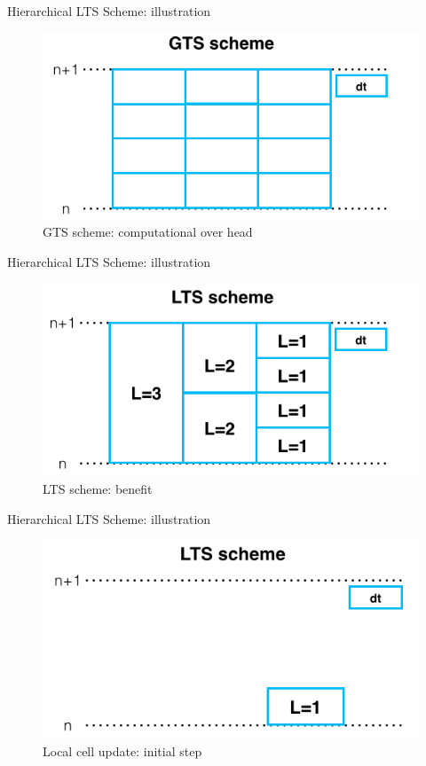 \documentclass{beamer}
\begin{document}
\begin{frame}{Hierarchical LTS Scheme: illustration}
\begin{figure}[p]
    \centering
    \includegraphics[width=1\textwidth]{GTS_scheme}
    \caption{GTS scheme: computational over head}
    \label{fig:awesome_image}
\end{figure}
\end{frame}
\begin{frame}{Hierarchical LTS Scheme: illustration}
\begin{figure}[p]
    \centering
    \includegraphics[width=1\textwidth]{LTS_scheme}
    \caption{LTS scheme: benefit}
    \label{fig:image}
\end{figure}
\end{frame}
\begin{frame}{Hierarchical LTS Scheme: illustration}
\begin{figure}[p]
    \centering
    \includegraphics[width=1\textwidth]{LTS_T1}
    \caption{Local cell update: initial step}
    \label{fig:some_image}
\end{figure}
\end{frame}
\end{document}
